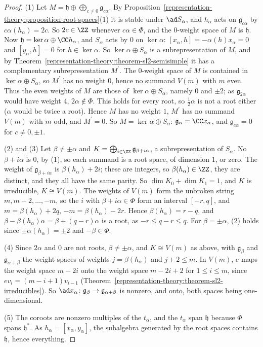 \begin{proof}
(1) Let $M = \mathfrak{h} \oplus \bigoplus_{c \neq 0}\mathfrak{g}_{c\alpha}$. By Proposition~\ref{representation-theory:proposition-root-spaces}(1) it is stable under $\ad S_\alpha$, and
$h_\alpha$ acts on $\mathfrak{g}_{c\alpha}$ by $c\alpha(h_\alpha) = 2c$. So $2c \in \ZZ$ whenever $c\alpha \in \Phi$, and the $0$-weight space of $M$ is $\mathfrak{h}$. Now
$\mathfrak{h} = \ker\alpha \oplus \CC h_\alpha$, and $S_\alpha$ acts by $0$ on $\ker\alpha$: $[x_\alpha, h] = -\alpha(h)x_\alpha = 0$ and $[y_\alpha, h] = 0$ for
$h \in \ker\alpha$. So $\ker\alpha \oplus S_\alpha$ is a subrepresentation of $M$, and by Theorem~\ref{representation-theory:theorem-sl2-semisimple} it has a complementary
subrepresentation $M^{\prime}$. The $0$-weight space of $M$ is contained in $\ker\alpha \oplus S_\alpha$, so $M^{\prime}$ has no weight $0$, hence no summand $V(m)$ with $m$ even. Thus
the even weights of $M$ are those of $\ker\alpha \oplus S_\alpha$, namely $0$ and $\pm2$; as $\mathfrak{g}_{2\alpha}$ would have weight $4$, $2\alpha \notin \Phi$. This holds for every
root, so $\frac12\alpha$ is not a root either ($\alpha$ would be twice a root). Hence $M$ has no weight $1$, $M^{\prime}$ has no summand $V(m)$ with $m$ odd, and $M^{\prime} = 0$. So
$M = \ker\alpha \oplus S_\alpha$: $\mathfrak{g}_\alpha = \CC x_\alpha$, and $\mathfrak{g}_{c\alpha} = 0$ for $c \neq 0, \pm1$.

(2) and (3) Let $\beta \neq \pm\alpha$ and $K = \bigoplus_{i \in \ZZ}\mathfrak{g}_{\beta + i\alpha}$, a subrepresentation of $S_\alpha$. No $\beta + i\alpha$ is $0$, by (1), so each
summand is a root space, of dimension $1$, or zero. The weight of $\mathfrak{g}_{\beta + i\alpha}$ is $\beta(h_\alpha) + 2i$; these are integers, so $\beta(h_\alpha) \in \ZZ$, they are
distinct, and they all have the same parity. So $\dim K_0 + \dim K_1 = 1$, and $K$ is irreducible, $K \cong V(m)$. The weights of $V(m)$ form the unbroken string $m, m - 2, \ldots, -m$,
so the $i$ with $\beta + i\alpha \in \Phi$ form an interval $[-r, q]$, and $m = \beta(h_\alpha) + 2q$, $-m = \beta(h_\alpha) - 2r$. Hence $\beta(h_\alpha) = r - q$, and
$\beta - \beta(h_\alpha)\alpha = \beta + (q - r)\alpha$ is a root, as $-r \leq q - r \leq q$. For $\beta = \pm\alpha$, (2) holds since $\pm\alpha(h_\alpha) = \pm2$ and $-\beta \in \Phi$.

(4) Since $2\alpha$ and $0$ are not roots, $\beta \neq \pm\alpha$, and $K \cong V(m)$ as above, with $\mathfrak{g}_\beta$ and $\mathfrak{g}_{\alpha + \beta}$ the weight spaces of
weights $j = \beta(h_\alpha)$ and $j + 2 \leq m$. In $V(m)$, $e$ maps the weight space $m - 2i$ onto the weight space $m - 2i + 2$ for $1 \leq i \leq m$, since
$ev_i = (m - i + 1)v_{i-1}$ (Theorem~\ref{representation-theory:theorem-sl2-irreducibles}). So $\ad x_\alpha \colon \mathfrak{g}_\beta \to \mathfrak{g}_{\alpha + \beta}$ is nonzero, and
onto, both spaces being one-dimensional.

(5) The coroots are nonzero multiples of the $t_\alpha$, and the $t_\alpha$ span $\mathfrak{h}$ because $\Phi$ spans $\mathfrak{h}^*$. As $h_\alpha = [x_\alpha, y_\alpha]$, the
subalgebra generated by the root spaces contains $\mathfrak{h}$, hence everything.
\end{proof}

